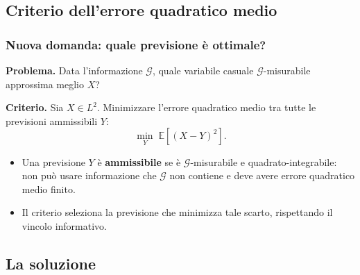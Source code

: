 \documentclass[handout]{beamer}%
\newenvironment{stepitemize}{\begin{itemize}[<+->]}{\end{itemize} }
\providecommand{\E}{\mathbb{E}}
\providecommand{\G}{\mathcal{G}}
\providecommand{\1}{\mathbf{1}}
\providecommand{\QTR}[2]{\csname #1\endcsname{#2}}
\begin{document}
\subsection{Criterio dell'errore quadratico medio}%

\begin{frame}%
%

\frametitle{Nuova domanda: quale previsione \`{e} ottimale?}%
%

%


\textbf{Problema.} Data l'informazione $\G$, quale variabile casuale
$\G$-misurabile approssima meglio $X$?

\medskip

\textbf{Criterio.} Sia $X \in L^{2}$. Minimizzare l'errore quadratico medio
tra tutte le previsioni ammissibili $Y$:
\[
\min_{Y} \; \E\left[ (X - Y)^{2}\right] .
\]


\medskip

\begin{stepitemize}


\item Una previsione $Y$ \`{e} \textbf{ammissibile} se \`{e} $\G$-misurabile e
quadrato-integrabile: non pu\`{o} usare informazione che $\G$ non contiene e
deve avere errore quadratico medio finito.

\item Il criterio seleziona la previsione che minimizza tale scarto,
rispettando il vincolo informativo.
\end{stepitemize}%

\transboxout
\end{frame}%


\subsection{La soluzione}%
\end{document}
